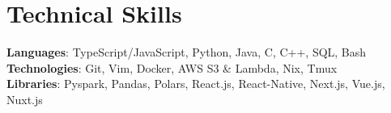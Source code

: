 \section{Technical Skills}
\begin{itemize}[leftmargin=0.15in, label={}]
	\small{\item{
	      \textbf{Languages}{: TypeScript/JavaScript, Python, Java, C, C++, SQL, Bash } \\
        \textbf{Technologies}{: Git, Vim, Docker, AWS S3 \& Lambda, Nix, Tmux } \\
        \textbf{Libraries}{: Pyspark, Pandas, Polars, React.js, React-Native, Next.js, Vue.js, Nuxt.js}}}
\end{itemize}
